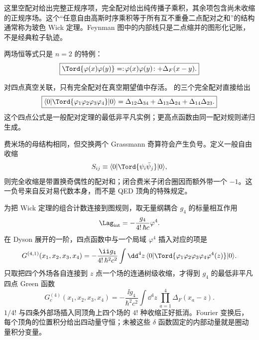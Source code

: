 这里空配对给出完整正规序项，完全配对给出纯传播子乘积，其余项包含尚未收缩的正规序场。这个“任意自由高斯时序乘积等于所有互不重叠二点配对之和”的结构通常称为玻色 Wick 定理。Feynman 图中的内部线只是二点缩并的图形化记账，不是经典粒子轨迹。

两场恒等式只是 $n=2$ 的特例：
\begin{equation}
 \boxed{
 \Tord\{\varphi(x)\varphi(y)\}
 =:\!\varphi(x)\varphi(y)\!:+\Delta_F(x-y).}
 \label{eq:wick-two-field-r68}
\end{equation}

对四点真空关联，只有完全配对在真空期望值中存活。 的三个完全配对直接给出
\begin{equation}
 \boxed{
 \langle0|\Tord\{\varphi_1\varphi_2\varphi_3\varphi_4\}|0\rangle
 =\Delta_{12}\Delta_{34}
 +\Delta_{13}\Delta_{24}
 +\Delta_{14}\Delta_{23}.}
 \label{eq:wick-four-scalar-example-dp48}
\end{equation}
这个四点公式是一般配对定理的最低非平凡实例；更高点函数由同一配对规则递归生成。

费米场的母结构相同，但交换两个 Grassmann 奇算符会产生负号。定义一般自由收缩
\begin{equation*}
 S_{ij}\equiv\langle0|\Tord\{\psi_i\bar\psi_j\}|0\rangle,
\end{equation*}
则完全收缩是带置换奇偶性的配对和；闭合费米子闭合圈因而额外带一个 $-1$。这一负号来自反对易代数本身，而不是 QED 顶角的特殊规定。


为把 Wick 定理的组合计数连接到图规则，取无量纲耦合 $g_4$ 的标量相互作用
\begin{equation*}
 \Lag_{\rm int}=-\frac{g_4}{4!\,\hbar c}\varphi^4.
\end{equation*}
在 Dyson 展开的一阶，四点函数中与一个局域 $\varphi^4$ 插入对应的项是
\begin{equation}
 G^{(4,1)}(x_1,x_2,x_3,x_4)
 =-\frac{\ii g_4}{4!\,\hbar^2c^2}
 \int\dd^4 z\,
 \langle0|\Tord\{\varphi_1\varphi_2\varphi_3\varphi_4\varphi^4(z)\}|0\rangle .
 \label{eq:phi4-first-dyson-r68}
\end{equation}
只取把四个外场各自连接到 $z$ 点一个场的连通树级收缩，才得到 $g_4$ 的最低非平凡四点 Green 函数
\begin{equation}
 \boxed{
 G_c^{(4)}(x_1,x_2,x_3,x_4)
 =-\frac{\ii g_4}{\hbar^2c^2}
 \int\dd^4 z\,\prod_{a=1}^{4}\Delta_F(x_a-z).}
 \label{eq:phi4-tree-green-r3}
\end{equation}
$1/4!$ 与四条外部场插入同顶角上四个场的 $4!$ 种收缩正好抵消。Fourier 变换后，每个顶角的位置积分给出四动量守恒；未被这些 $\delta$ 函数固定的内部动量就是圈动量积分变量。

